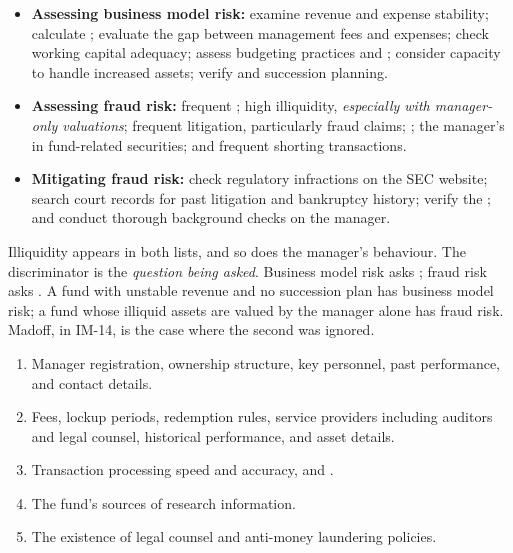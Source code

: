\begin{itemize}
\item \textbf{Assessing business model risk:} examine revenue and expense
stability; calculate ; evaluate
the gap between management fees and expenses; check working capital adequacy;
assess budgeting practices and ; consider capacity to
handle increased assets; verify  and succession
planning.
\item \textbf{Assessing fraud risk:} frequent ;
high illiquidity, \emph{especially with manager-only valuations}; frequent
litigation, particularly fraud claims; ;
the manager's  in fund-related securities; and frequent
shorting transactions.
\item \textbf{Mitigating fraud risk:} check regulatory infractions on the SEC
website; search court records for past litigation and bankruptcy history; verify
the ; and conduct thorough
background checks on the manager.
\end{itemize}

\begin{imtrapbox}[breakable=false,title={Sibling pair: the two risks share indicators}]
Illiquidity appears in both lists, and so does the manager's behaviour. The
discriminator is the \emph{question being asked}. Business model risk asks
; fraud risk asks . A fund with unstable revenue and no succession plan has business model
risk; a fund whose illiquid assets are valued by the manager alone has fraud risk.
Madoff, in IM-14, is the case where the second was ignored.
\end{imtrapbox}



\begin{enumerate}[label=\alph*)]
\item {} Manager registration, ownership structure, key
personnel, past performance, and contact details.
\item {} Fees, lockup periods, redemption rules, service
providers including auditors and legal counsel, historical performance, and asset
details.
\item {} Transaction processing speed and accuracy, and
.
\item {} The fund's sources of research information.
\item {} The existence of legal counsel and anti-money laundering
policies.
\end{enumerate}

